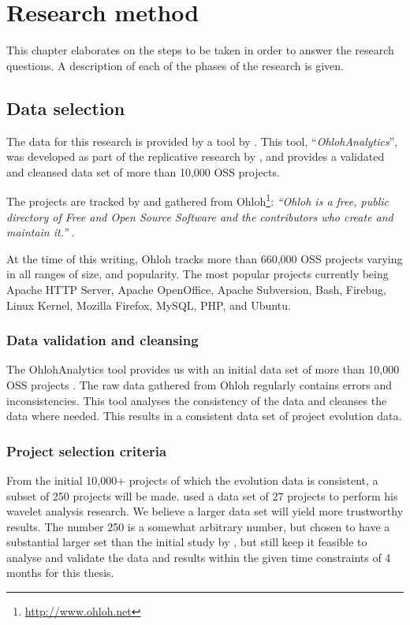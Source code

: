 \chapter{Research method}
\label{method}

This chapter elaborates on the steps to be taken in order to answer the
research questions. A description of each of the phases of the research is
given.

\section{Data selection}
\label{method:data}

The data for this research is provided by a tool by \citet{ohlohanalytics}.
This tool, ``\emph{OhlohAnalytics}\rm'', was developed as part of the
replicative research by \citet{bruntink2014}, and provides a validated and
cleansed data set of more than 10,000 OSS projects.

The projects are tracked by and gathered from
Ohloh\footnote{\url{http://www.ohloh.net}}: \emph{``Ohloh is a free, public
directory of Free and Open Source Software and the contributors who create and
maintain it.'' }\rm \cite{ohloh}.

At the time of this writing, Ohloh tracks more than 660,000 OSS projects varying
in all ranges of size, and popularity. The most popular projects currently being
Apache HTTP Server, Apache OpenOffice, Apache Subversion, Bash, Firebug, Linux
Kernel, Mozilla Firefox, MySQL, PHP, and Ubuntu.

\subsection{Data validation and cleansing}
The OhlohAnalytics tool provides us with an initial data set of more than
10,000 OSS projects \cite{bruntink2014}. The raw data gathered from Ohloh
regularly contains errors and inconsistencies. This tool analyses the
consistency of the data and cleanses the data where needed. This results in a
consistent data set of project evolution data.



\subsection{Project selection criteria}

From the initial 10,000+ projects of which the evolution data is consistent, a
subset of 250 projects will be made. \citet{karus2013} used a data set of 27
projects to perform his wavelet analysis research. We believe a larger
data set will yield more trustworthy results. The number 250 is a somewhat
arbitrary number, but chosen to have a substantial larger set than the initial
study by \citeauthor{karus2013}, but still keep it feasible to analyse and
validate the data and results within the given time constraints of 4 months for
this thesis.

